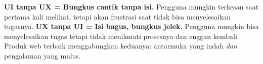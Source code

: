 \begin{konsep}
\textbf{UI tanpa UX = Bungkus cantik tanpa isi.} Pengguna mungkin terkesan saat pertama kali melihat, tetapi akan frustrasi saat tidak bisa menyelesaikan tugasnya. \textbf{UX tanpa UI = Isi bagus, bungkus jelek.} Pengguna mungkin bisa menyelesaikan tugas tetapi tidak menikmati prosesnya dan enggan kembali. Produk web terbaik menggabungkan keduanya: antarmuka yang indah \textit{dan} pengalaman yang mulus.
\end{konsep}

